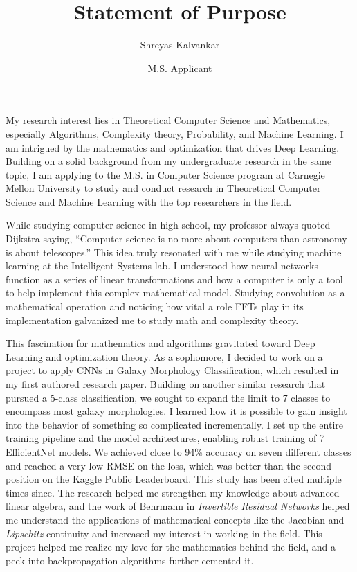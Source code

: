 \documentclass{article}
\title{Statement of Purpose}
\author{Shreyas Kalvankar}
\date{M.S. Applicant}
\begin{document}
  \maketitle%
  \thispagestyle{empty}
My research interest lies in Theoretical Computer Science and Mathematics,
especially Algorithms, Complexity theory, Probability, and Machine Learning. I
am intrigued by the mathematics and optimization that drives Deep Learning.
Building on a solid background from my undergraduate research in the same
topic, I am applying to the M.S. in Computer Science program at Carnegie Mellon
University to study and conduct research in Theoretical Computer Science and
Machine Learning with the top researchers in the field.
\vspace{6pt}

While studying computer science in high school, my professor always quoted
Dijkstra saying, “Computer science is no more about computers than astronomy is
about telescopes.” This idea truly resonated with me while studying machine
learning at the Intelligent Systems lab. I understood how neural networks
function as a series of linear transformations and how a computer is only a
tool to help implement this complex mathematical model. Studying convolution as
a mathematical operation and noticing how vital a role FFTs play in its
implementation galvanized me to study math and complexity theory. 
\vspace{6pt}

This fascination for mathematics and algorithms gravitated toward Deep Learning
and optimization theory. As a sophomore, I decided to work on a project to
apply CNNs in Galaxy Morphology Classification, which resulted in my first
authored research paper. Building on another similar research that pursued a
5-class classification, we sought to expand the limit to 7 classes to encompass
most galaxy morphologies. I learned how it is possible to gain insight into the
behavior of something so complicated incrementally. I set up the entire
training pipeline and the model architectures, enabling robust training of 7
EfficientNet models. We achieved close to 94\% accuracy on seven different
classes and reached a very low RMSE on the loss, which was better than the
second position on the Kaggle Public Leaderboard. This study has been cited
multiple times since. The research helped me strengthen my knowledge about
advanced linear algebra, and the work of Behrmann in \textit{Invertible
Residual Networks} helped me understand the applications of mathematical
concepts like the Jacobian and \textit{Lipschitz} continuity and increased my
interest in working in the field. This project helped me realize my love for
the mathematics behind the field, and a peek into backpropagation algorithms
further cemented it. 
\vspace{6pt}
\end{document}
